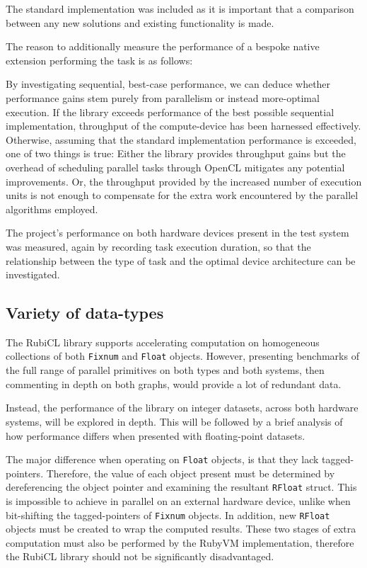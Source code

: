 The standard implementation was included as it is important that a comparison between any new solutions and existing functionality is made.

The reason to additionally measure the performance of a bespoke native extension performing the task is as follows:

By investigating sequential, best-case performance, we can deduce whether performance gains stem purely from parallelism or instead more-optimal execution. If the library exceeds performance of the best possible sequential implementation, throughput of the compute-device has been harnessed effectively. Otherwise, assuming that the standard implementation performance is exceeded, one of two things is true: Either the library provides throughput gains but the overhead of scheduling parallel tasks through \ac{OpenCL} mitigates any potential improvements. Or, the throughput provided by the increased number of execution units is not enough to compensate for the extra work encountered by the parallel algorithms employed.

The project's performance on both hardware devices present in the test system was measured, again by recording task execution duration, so that the relationship between the type of task and the optimal device architecture can be investigated.



\subsection{Variety of data-types}
The RubiCL library supports accelerating computation on homogeneous collections of both \verb|Fixnum| and \verb|Float| objects.
However, presenting benchmarks of the full range of parallel primitives on both types and both systems, then commenting in depth on both graphs, would provide a lot of redundant data.

Instead, the performance of the library on integer datasets, across both hardware systems, will be explored in depth.
This will be followed by a brief analysis of how performance differs when presented with floating-point datasets.

 The major difference when operating on \verb|Float| objects, is that they lack tagged-pointers. Therefore, the value of each object present must be determined by dereferencing the object pointer and examining the resultant \verb|RFloat| struct. This is impossible to achieve in parallel on an external hardware device, unlike when bit-shifting the tagged-pointers of \verb|Fixnum| objects. In addition,  new \verb|RFloat| objects must be created to wrap the computed results.
 These two stages of extra computation must also be performed by the RubyVM implementation, therefore the RubiCL library should not be significantly disadvantaged.

